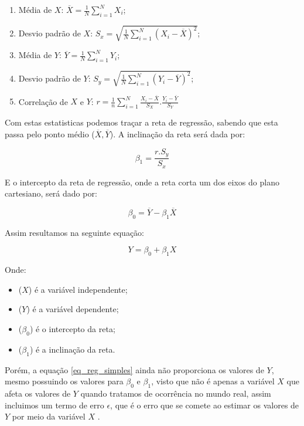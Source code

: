 \documentclass[
	12pt,				%
	openright,			%
	oneside,			%
	a4paper,			%
	english,			%
	brazil				%
	]{abntex2}
\begin{document}
\begin{enumerate}
	\item Média de $X$: $\overline{X} = \frac{1}{N} \sum_{i=1}^{N} X_i$;
	\item Desvio padrão de $X$: $S_x = \sqrt{ \frac{1}{N} \sum_{i=1}^{N} (X_i - \overline{X})^2 }$;
	\item Média de $Y$: $\overline{Y} = \frac{1}{N} \sum_{i=1}^{N} Y_i$;
	\item Desvio padrão de $Y$: $S_y = \sqrt{ \frac{1}{N} \sum_{i=1}^{N} (Y_i - \overline{Y})^2 }$;
	\item Correlação de $X$ e $Y$: $r = \frac{1}{n} \sum_{i=1}^{N} \frac{X_i - \overline{X}}{S_X} . \frac{Y_i - \overline{Y}}{S_Y}$
\end{enumerate}

Com estas estatisticas podemos traçar a reta de regressão, sabendo que esta passa pelo ponto médio
($\overline{X}, \overline{Y}$). A inclinação da reta será dada por:

\begin{equation}
	\label{inclinacao_reta}
	\beta_1 = \frac{r.S_y}{S_x}
\end{equation}

E o intercepto da reta de regressão, onde a reta corta um dos eixos do plano cartesiano, 
será dado por:

\begin{equation}
	\label{intercepto_reta}
	\beta_0 = \overline{Y} - \beta_1 \overline{X}
\end{equation}

Assim resultamos na seguinte equação:

\begin{equation}
\label{eq_reg_simples}
	Y = \beta_0 + \beta_1X
\end{equation}

Onde:
\begin{itemize}
	\item ($X$) é a variável independente;
	\item ($Y$) é a variável dependente;
	\item ($\beta_0$) é o intercepto da reta;
	\item ($\beta_1$) é a inclinação da reta. 
\end{itemize}

Porém, a equação \ref{eq_reg_simples} ainda não proporciona os valores de $Y$, mesmo possuindo
os valores para $\beta_0$ e $\beta_1$, visto que não é apenas a variável  $X$ que afeta os valores de
$Y$ quando tratamos de ocorrência no mundo real, assim incluimos um termo de erro $\epsilon$, que é
o erro que se comete ao estimar os valores de $Y$ por meio da variável $X$ \cite{modelos_regressao_linear}.
\end{document}
